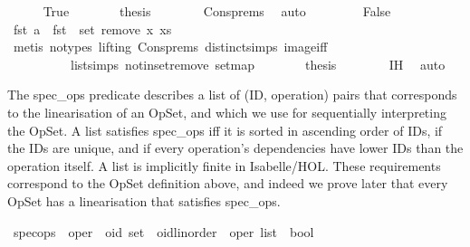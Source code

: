 \begin{isabellebody}
\ \ \ \ \isamarkupfalse%
\ True\isanewline
\ \ \ \ \isamarkupfalse%
\ \isamarkupfalse%
\ {\isacharquery}thesis\isanewline
\ \ \ \ \ \ \isamarkupfalse%
\ Cons{\isachardot}prems\ \isamarkupfalse%
\ auto\isanewline
\ \ \isamarkupfalse%
\isanewline
\ \ \ \ \isamarkupfalse%
\ False\isanewline
\ \ \ \ \isamarkupfalse%
\ \isamarkupfalse%
\ {\isachardoublequoteopen}fst\ a\ {\isasymnotin}\ fst\ {\isacharbackquote}\ set\ {\isacharparenleft}remove{}\ x\ xs{\isacharparenright}{\isachardoublequoteclose}\isanewline
\ \ \ \ \ \ \isamarkupfalse%
\ {\isacharparenleft}metis\ {\isacharparenleft}no{\isacharunderscore}types{\isacharcomma}\ lifting{\isacharparenright}\ Cons{\isachardot}prems\ distinct{\isachardot}simps{\isacharparenleft}{}{\isacharparenright}\ image{\isacharunderscore}iff\isanewline
\ \ \ \ \ \ \ \ \ \ list{\isachardot}simps{\isacharparenleft}{}{\isacharparenright}\ notin{\isacharunderscore}set{\isacharunderscore}remove{}\ set{\isacharunderscore}map{\isacharparenright}\isanewline
\ \ \ \ \isamarkupfalse%
\ \isamarkupfalse%
\ {\isacharquery}thesis\isanewline
\ \ \ \ \ \ \isamarkupfalse%
\ IH\ \isamarkupfalse%
\ auto\isanewline
\ \ \isamarkupfalse%
\isanewline
{}\isamarkupfalse%
%
\endisatagproof
{\isafoldproof}%
%
\isadelimproof
%
\endisadelimproof
%
\isamarkuptrue%
%
\begin{isamarkuptext}%
The spec\_ops predicate describes a list of (ID, operation) pairs that
corresponds to the linearisation of an OpSet, and which we use for sequentially
interpreting the OpSet. A list satisfies spec\_ops iff it is sorted in ascending
order of IDs, if the IDs are unique, and if every operation's dependencies have
lower IDs than the operation itself. A list is implicitly finite in Isabelle/HOL.
These requirements correspond to the OpSet definition above, and indeed we prove
later that every OpSet has a linearisation that satisfies spec\_ops.%
\end{isamarkuptext}\isamarkuptrue%
\isamarkupfalse%
\ spec{\isacharunderscore}ops\ {\isacharcolon}{\isacharcolon}\ {\isachardoublequoteopen}{\isacharparenleft}{\isacharprime}oper\ {\isasymRightarrow}\ {\isacharprime}oid\ set{\isacharparenright}\ {\isasymRightarrow}\ {\isacharparenleft}{\isacharprime}oid{\isacharcolon}{\isacharcolon}{\isacharbraceleft}linorder{\isacharbraceright}\ {\isasymtimes}\ {\isacharprime}oper{\isacharparenright}\ list\ {\isasymRightarrow}\ bool{\isachardoublequoteclose}\ \isanewline

\end{isabellebody}
